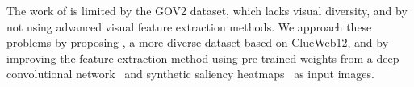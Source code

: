 The work of \citet{fan2017learning} is limited by the GOV2 dataset, which lacks visual diversity, and by not using advanced visual feature extraction methods.
We approach these problems by proposing \datasetname, a more diverse dataset based on ClueWeb12, and by improving the feature extraction method using
pre-trained weights from a deep convolutional network~\cite{simonyan2014very} and 
synthetic saliency heatmaps~\cite{shan2017two} as input images.






